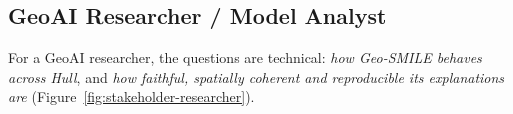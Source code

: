 \subsection{GeoAI Researcher / Model Analyst}
For a GeoAI researcher, the questions are technical: \emph{how Geo-SMILE behaves across Hull},
and \emph{how faithful, spatially coherent and reproducible its explanations are}
(Figure~\ref{fig:stakeholder-researcher}).\par\medskip
%



